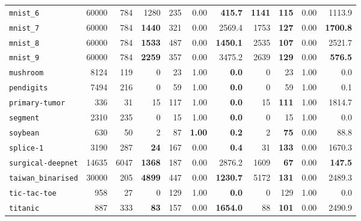 \begin{tabular}{lccrrrrrrrr}
\texttt{mnist\_6} & \multicolumn{1}{r}{60000} & \multicolumn{1}{r}{784}  & 1280 & 235 & 0.00 & \textbf{415.7} & \textbf{1141} & \textbf{115} & 0.00 & 1113.9\\
\texttt{mnist\_7} & \multicolumn{1}{r}{60000} & \multicolumn{1}{r}{784}  & \textbf{1440} & 321 & 0.00 & 2569.4 & 1753 & \textbf{127} & 0.00 & \textbf{1700.8}\\
\texttt{mnist\_8} & \multicolumn{1}{r}{60000} & \multicolumn{1}{r}{784}  & \textbf{1533} & 487 & 0.00 & \textbf{1450.1} & 2535 & \textbf{107} & 0.00 & 2521.7\\
\texttt{mnist\_9} & \multicolumn{1}{r}{60000} & \multicolumn{1}{r}{784}  & \textbf{2259} & 357 & 0.00 & 3475.2 & 2639 & \textbf{129} & 0.00 & \textbf{576.5}\\
\texttt{mushroom} & \multicolumn{1}{r}{8124} & \multicolumn{1}{r}{119}  & 0 & 23 & 1.00 & \textbf{0.0} & 0 & 23 & 1.00 & 0.0\\
\texttt{pendigits} & \multicolumn{1}{r}{7494} & \multicolumn{1}{r}{216}  & 0 & 59 & 1.00 & \textbf{0.0} & 0 & 59 & 1.00 & 0.1\\
\texttt{primary-tumor} & \multicolumn{1}{r}{336} & \multicolumn{1}{r}{31}  & 15 & 117 & 1.00 & \textbf{0.0} & 15 & \textbf{111} & 1.00 & 1814.7\\
\texttt{segment} & \multicolumn{1}{r}{2310} & \multicolumn{1}{r}{235}  & 0 & 15 & 1.00 & \textbf{0.0} & 0 & 15 & 1.00 & 0.0\\
\texttt{soybean} & \multicolumn{1}{r}{630} & \multicolumn{1}{r}{50}  & 2 & 87 & \textbf{1.00} & \textbf{0.2} & 2 & \textbf{75} & 0.00 & 88.8\\
\texttt{splice-1} & \multicolumn{1}{r}{3190} & \multicolumn{1}{r}{287}  & \textbf{24} & 167 & 0.00 & \textbf{0.4} & 31 & \textbf{133} & 0.00 & 1670.3\\
\texttt{surgical-deepnet} & \multicolumn{1}{r}{14635} & \multicolumn{1}{r}{6047}  & \textbf{1368} & 187 & 0.00 & 2876.2 & 1609 & \textbf{67} & 0.00 & \textbf{147.5}\\
\texttt{taiwan\_binarised} & \multicolumn{1}{r}{30000} & \multicolumn{1}{r}{205}  & \textbf{4899} & 447 & 0.00 & \textbf{1230.7} & 5172 & \textbf{131} & 0.00 & 2489.3\\
\texttt{tic-tac-toe} & \multicolumn{1}{r}{958} & \multicolumn{1}{r}{27}  & 0 & 129 & 1.00 & \textbf{0.0} & 0 & 129 & 1.00 & 0.0\\
\texttt{titanic} & \multicolumn{1}{r}{887} & \multicolumn{1}{r}{333}  & \textbf{83} & 157 & 0.00 & \textbf{1654.0} & 88 & \textbf{101} & 0.00 & 2490.9\\

\end{tabular}
